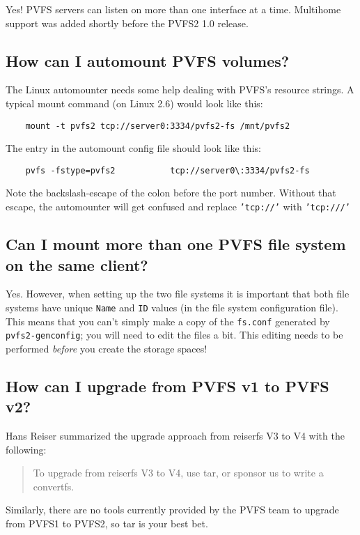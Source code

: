 \documentclass[11pt,letterpaper]{article}
\begin{document}
Yes!  PVFS servers can listen on more than one interface at a time.
Multihome support was added shortly before the PVFS2 1.0 release.

\subsection{How can I automount PVFS volumes?}

The Linux automounter needs some help dealing with PVFS's resource
strings.  A typical mount command (on Linux 2.6) would look like this:

\begin{verbatim}
	mount -t pvfs2 tcp://server0:3334/pvfs2-fs /mnt/pvfs2
\end{verbatim}

The entry in the automount config file should look like this:

\begin{verbatim}
	pvfs -fstype=pvfs2           tcp://server0\:3334/pvfs2-fs
\end{verbatim}

Note the backslash-escape of the colon before the port number.  Without that
escape, the automounter will get confused and replace \texttt{'tcp://'} with
\texttt{'tcp:///'}

\subsection{Can I mount more than one PVFS file system on the same client?}
\label{sec:multiple-mounts}

Yes.  However, when setting up the two file systems it is important that both
file systems have unique \texttt{Name} and \texttt{ID} values (in the
file system configuration file).  This means that you can't simply make a copy
of the \texttt{fs.conf} generated by \texttt{pvfs2-genconfig}; you will need
to edit the files a bit.  This editing needs to be performed \emph{before} you
create the storage spaces!

\subsection{How can I upgrade from PVFS v1 to PVFS v2?}

Hans Reiser summarized the upgrade approach from reiserfs V3 to V4 with the following:
\begin{quote}
To upgrade from reiserfs V3 to V4, use tar, or sponsor us to write a convertfs.
\end{quote}
Similarly, there are no tools currently provided by the PVFS team to
upgrade from PVFS1 to PVFS2, so tar is your best bet.
\end{document}
